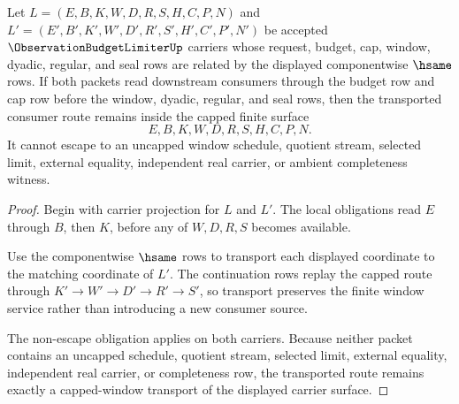 \begin{theorem}
\label{thm:observation-budget-limiter-capped-window-transport}
Let $L=(E,B,K,W,D,R,S,H,C,P,N)$ and $L'=(E',B',K',W',D',R',S',H',C',P',N')$ be accepted $\ObservationBudgetLimiterUp$ carriers whose request, budget, cap, window, dyadic, regular, and seal rows are related by the displayed componentwise $\hsame$ rows. If both packets read downstream consumers through the budget row and cap row before the window, dyadic, regular, and seal rows, then the transported consumer route remains inside the capped finite surface
$$
E,B,K,W,D,R,S,H,C,P,N.
$$
It cannot escape to an uncapped window schedule, quotient stream, selected limit, external equality, independent real carrier, or ambient completeness witness.
\end{theorem}
\begin{proof}
Begin with carrier projection for $L$ and $L'$. The local obligations read $E$ through $B$, then $K$, before any of $W,D,R,S$ becomes available.

Use the componentwise $\hsame$ rows to transport each displayed coordinate to the matching coordinate of $L'$. The continuation rows replay the capped route through $K' \to W' \to D' \to R' \to S'$, so transport preserves the finite window service rather than introducing a new consumer source.

The non-escape obligation applies on both carriers. Because neither packet contains an uncapped schedule, quotient stream, selected limit, external equality, independent real carrier, or completeness row, the transported route remains exactly a capped-window transport of the displayed carrier surface.
\end{proof}

